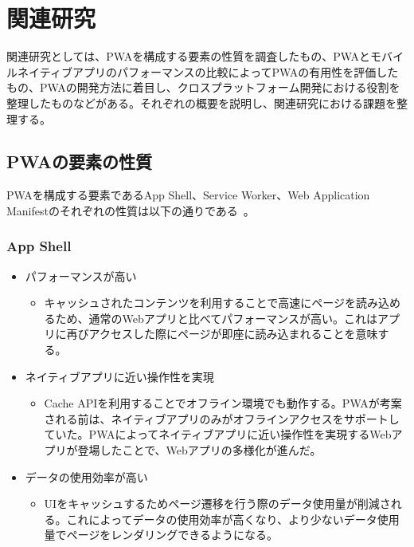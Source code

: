 \section{関連研究}
\label{section:関連研究}
関連研究としては、PWAを構成する要素の性質を調査したもの、PWAとモバイルネイティブアプリのパフォーマンスの比較によってPWAの有用性を評価したもの、PWAの開発方法に着目し、クロスプラットフォーム開発における役割を整理したものなどがある。それぞれの概要を説明し、関連研究における課題を整理する。
\subsection{PWAの要素の性質}
\label{subsection:PWAの要素の性質}
PWAを構成する要素であるApp Shell、Service Worker、Web Application Manifestのそれぞれの性質は以下の通りである~\cite{Tandel2018ProgressiveWebApps}。
\subsubsection{App Shell}
\label{subsubsection:App Shell}
\begin{itemize}
    \item パフォーマンスが高い
    \begin{itemize}
      \item キャッシュされたコンテンツを利用することで高速にページを読み込めるため、通常のWebアプリと比べてパフォーマンスが高い。これはアプリに再びアクセスした際にページが即座に読み込まれることを意味する。
    \end{itemize}
    \item ネイティブアプリに近い操作性を実現
    \begin{itemize}
        \item Cache APIを利用することでオフライン環境でも動作する。PWAが考案される前は、ネイティブアプリのみがオフラインアクセスをサポートしていた。PWAによってネイティブアプリに近い操作性を実現するWebアプリが登場したことで、Webアプリの多様化が進んだ。
    \end{itemize}
    \item データの使用効率が高い
    \begin{itemize}
        \item UIをキャッシュするためページ遷移を行う際のデータ使用量が削減される。これによってデータの使用効率が高くなり、より少ないデータ使用量でページをレンダリングできるようになる。
    \end{itemize}
\end{itemize}
